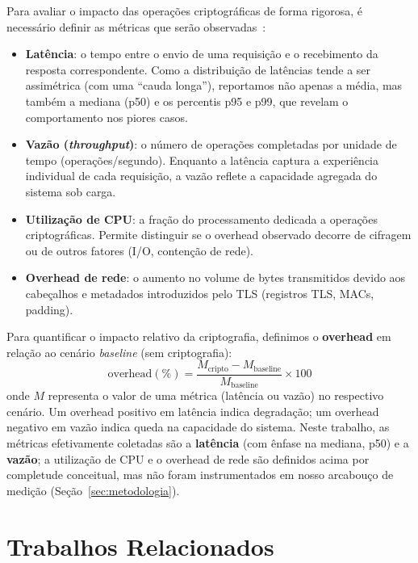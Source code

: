 \documentclass[12pt]{article}
\begin{document}
Para avaliar o impacto das operações criptográficas de forma rigorosa, é
necessário definir as métricas que serão
observadas~\cite{cooper2010ycsb}:

\begin{itemize}
  \item \textbf{Latência}: o tempo entre o envio de uma requisição e o
        recebimento da resposta correspondente. Como a distribuição de latências
        tende a ser assimétrica (com uma ``cauda longa''), reportamos não apenas
        a média, mas também a mediana (p50) e os percentis p95 e p99, que
        revelam o comportamento nos piores casos.
  \item \textbf{Vazão (\emph{throughput})}: o número de operações completadas
        por unidade de tempo (operações/segundo). Enquanto a latência captura a
        experiência individual de cada requisição, a vazão reflete a capacidade
        agregada do sistema sob carga.
  \item \textbf{Utilização de CPU}: a fração do processamento dedicada a
        operações criptográficas. Permite distinguir se o overhead observado
        decorre de cifragem ou de outros fatores (I/O, contenção de rede).
  \item \textbf{Overhead de rede}: o aumento no volume de bytes transmitidos
        devido aos cabeçalhos e metadados introduzidos pelo TLS (registros TLS,
        MACs, padding).
\end{itemize}

Para quantificar o impacto relativo da criptografia, definimos o
\textbf{overhead} em relação ao cenário \emph{baseline} (sem criptografia):
\begin{equation}
  \label{eq:overhead}
  \text{overhead}(\%) = \frac{M_{\text{cripto}} - M_{\text{baseline}}}{M_{\text{baseline}}} \times 100
\end{equation}
onde $M$ representa o valor de uma métrica (latência ou vazão) no respectivo
cenário. Um overhead positivo em latência indica degradação; um overhead
negativo em vazão indica queda na capacidade do sistema. Neste trabalho, as
métricas efetivamente coletadas são a \textbf{latência} (com ênfase na mediana,
p50) e a \textbf{vazão}; a utilização de CPU e o overhead de rede são definidos
acima por completude conceitual, mas não foram instrumentados em nosso
arcabouço de medição (Seção~\ref{sec:metodologia}).


\section{Trabalhos Relacionados}
\label{sec:relacionados}
\end{document}
